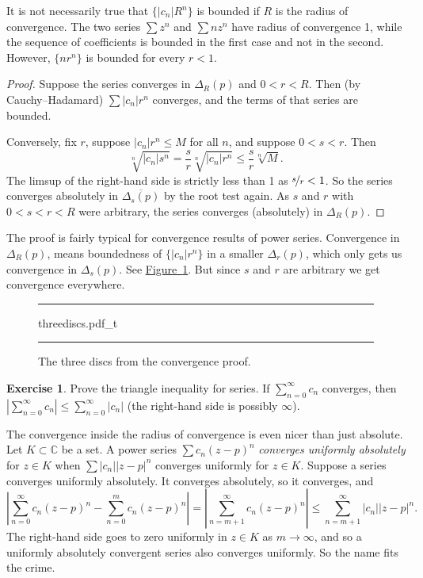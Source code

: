 \documentclass[12pt,openany]{book}
\newcommand{\sabs}[1]{\lvert {#1} \rvert}
\newcommand{\abs}[1]{\left\lvert {#1} \right\rvert}
\newcommand{\C}{{\mathbb{C}}}
\newcommand{\myindex}[1]{#1\index{#1}}
\theoremstyle{plain}
\theoremstyle{remark}
\theoremstyle{definition}
\newenvironment{exbox}{%
    \def\FrameCommand{\vrule width 1pt \relax\hspace{10pt}}%
    \MakeFramed{\advance\hsize-\width\FrameRestore}%
}{%
    \endMakeFramed
}
\newenvironment{myfig}{%
\begin{figure}[h!t]
\noindent\rule{\textwidth}{0.5pt}\vspace{12pt}\par\centering}%
{\par\noindent\rule{\textwidth}{0.5pt}
\end{figure}}
\theoremstyle{exercise}
\newtheorem{exercise}{Exercise}[section]
\theoremstyle{example}
\newcommand{\figureref}[1]{\hyperref[#1]{Figure~\ref*{#1}}}
\begin{document}
It is not necessarily true that $\bigl\{ \sabs{c_n} R^n \bigr\}$
is bounded if $R$ is the radius of convergence.
The two series $\sum z^n$ and $\sum n z^n$ have
radius of convergence 1, while the sequence of coefficients
is bounded in the first case and
not in the second.  However, $\{ n r^n \}$ is bounded for every $r < 1$.

\begin{proof}
Suppose the series converges in $\Delta_{R}(p)$ and
$0 < r < R$.  Then (by Cauchy--Hadamard) $\sum \sabs{c_n}r^n$ converges,
and the terms of that series are bounded.

Conversely, fix $r$, suppose 
$\sabs{c_n} r^n \leq M$ for all $n$, and suppose $0 < s < r$.
Then
\begin{equation*}
\sqrt[n]{\sabs{c_n} s^n}=
\frac{s}{r}\sqrt[n]{\sabs{c_n} r^n} \leq \frac{s}{r} \sqrt[n]{M} .
\end{equation*}
The limsup of the right-hand side is strictly less than 1 as $\nicefrac{s}{r} < 1$.
So the series converges absolutely in
$\overline{\Delta_s(p)}$ by the root test again.
As $s$ and $r$ with $0 < s < r < R$ were arbitrary,
the series converges (absolutely) in $\Delta_R(p)$.
\end{proof}

The proof is fairly typical for convergence results of power series.
Convergence in $\Delta_R(p)$, means boundedness of
$\{ \sabs{c_n} r^n \}$ in a smaller $\Delta_r(p)$, which only gets us convergence
in $\Delta_s(p)$.  See \figureref{fig:threediscs}.  But since $s$ and $r$
are arbitrary we get convergence everywhere.
\begin{myfig}
{threediscs.pdf_t}
\caption{The three discs from the convergence proof.\label{fig:threediscs}}
\end{myfig}

\begin{exbox}
\begin{exercise}
Prove the triangle inequality for series.  If $\sum_{n=0}^\infty c_n$
converges, then $\abs{\sum_{n=0}^\infty c_n} \leq \sum_{n=0}^\infty
\sabs{c_n}$ (the right-hand side is possibly $\infty$).
\end{exercise}
\end{exbox}

The convergence inside the radius of convergence is even nicer than just absolute.
Let $K \subset \C$ be a set.
A power series $\sum c_n {(z-p)}^n$
\emph{\myindex{converges uniformly absolutely}}
for $z \in K$ when $\sum \sabs{c_n} \sabs{z-p}^n$
converges uniformly for $z \in K$.
Suppose a series converges uniformly absolutely.  It converges absolutely,
so it converges, and 
\begin{equation*}
\abs{
\sum_{n=0}^\infty c_n {(z-p)}^n
-
\sum_{n=0}^{m} c_n {(z-p)}^n
}
=
\abs{\sum_{n=m+1}^\infty c_n {(z-p)}^n} \leq
\sum_{n=m+1}^\infty \sabs{c_n} \sabs{z-p}^n .
\end{equation*}
The right-hand side goes to zero uniformly in $z \in K$ as $m \to \infty$,
and so
a uniformly absolutely convergent series also converges
uniformly.  So the name fits the crime.
\end{document}
